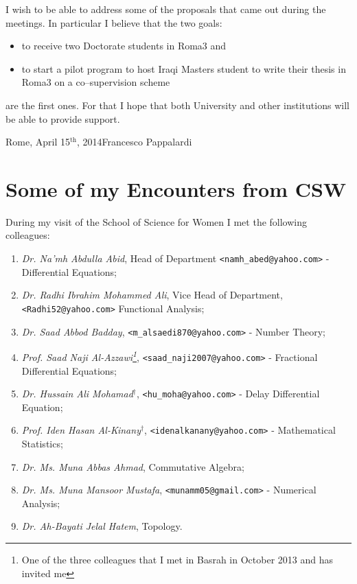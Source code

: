 \documentclass[12pt,a4paper]{scrartcl}
\begin{document}
I wish to be able to address some of the proposals that came out during the meetings. In particular I believe that the two goals:  
\begin{itemize}
 \item[\textborn] to receive two Doctorate students in Roma3 and 
 \item[\textborn] to start a pilot program to host Iraqi Masters student to write their thesis in Roma3 on a co--supervision scheme
\end{itemize}
are the first ones. For that I hope that both University and other institutions will be able to provide support.
\bigskip
\vfill

Rome, April 15$^{\textrm{th}}$, 2014\hfill Francesco Pappalardi
 \newpage

\section{Some of my Encounters from CSW}

During my visit of the School of Science for Women I met the following colleagues:
\begin{enumerate}
\item \textsl{Dr. Na'mh Abdulla Abid}, Head of Department \texttt{<namh\_abed@yahoo.com>} - Differential Equations;
\item \textsl{Dr. Radhi Ibrahim Mohammed Ali}, Vice Head of Department, \texttt{<Radhi52@yahoo.com>} Functional Analysis; 
\item \textsl{Dr. Saad Abbod Badday}, \texttt{<m\_alsaedi870@yahoo.com>} -  Number Theory; 
\item \textsl{Prof. Saad Naji Al-Azzawi\footnote{One of the three colleagues that I met in Basrah in October 2013 and has invited me}}, 
\texttt{<saad\_naji2007@yahoo.com>} - Fractional Differential Equations; 
\item \textsl{Dr. Hussain Ali Mohamad$^\dag$}, \texttt{<hu\_moha@yahoo.com>} - Delay Differential Equation;
\item \textsl{Prof. Iden Hasan Al-Kinany$^\dag$}, \texttt{<idenalkanany@yahoo.com>} - Mathematical Statistics;
\item \textsl{Dr. Ms. Muna Abbas Ahmad}, Commutative Algebra;
\item \textsl{Dr. Ms. Muna Mansoor Mustafa}, \texttt{<munamm05@gmail.com>} - Numerical Analysis;   
\item \textsl{Dr. Ah-Bayati Jelal Hatem}, Topology.
\end{enumerate}
\end{document}
